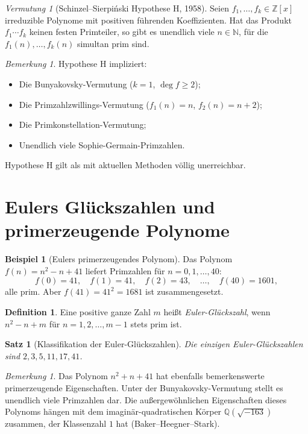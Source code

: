\documentclass[12pt,a4paper]{amsart}
\newtheorem{satz}[theorem]{Satz}
\theoremstyle{definition}
\newtheorem{definition_de}[theorem]{Definition}
\newtheorem{example}[theorem]{Beispiel}
\theoremstyle{remark}
\newtheorem{bemerkung}[theorem]{Bemerkung}
\newtheorem{vermutung}[theorem]{Vermutung}
\newcommand{\N}{\mathbb{N}}
\newcommand{\Z}{\mathbb{Z}}
\newcommand{\Q}{\mathbb{Q}}
\begin{document}
\begin{vermutung}[Schinzel--Sierpiński Hypothese H, 1958]
\label{verm:H}
Seien $f_1, \ldots, f_k \in \Z[x]$ irreduzible Polynome mit positiven
führenden Koeffizienten. Hat das Produkt $f_1 \cdots f_k$ keinen festen
Primteiler, so gibt es unendlich viele $n \in \N$, für die
$f_1(n), \ldots, f_k(n)$ simultan prim sind.
\end{vermutung}

\begin{bemerkung}
Hypothese H impliziert:
\begin{itemize}[nosep]
  \item Die Bunyakovsky-Vermutung ($k=1$, $\deg f \geq 2$);
  \item Die Primzahlzwillings-Vermutung ($f_1(n) = n$, $f_2(n) = n+2$);
  \item Die Primkonstellation-Vermutung;
  \item Unendlich viele Sophie-Germain-Primzahlen.
\end{itemize}
Hypothese H gilt als mit aktuellen Methoden völlig unerreichbar.
\end{bemerkung}

\section{Eulers Glückszahlen und primerzeugende Polynome}

\begin{example}[Eulers primerzeugendes Polynom]
Das Polynom $f(n) = n^2 - n + 41$ liefert Primzahlen für $n = 0, 1, \ldots, 40$:
\[
  f(0) = 41,\quad f(1) = 41,\quad f(2) = 43,\quad \ldots,\quad f(40) = 1601,
\]
alle prim. Aber $f(41) = 41^2 = 1681$ ist zusammengesetzt.
\end{example}

\begin{definition_de}
Eine positive ganze Zahl $m$ heißt \emph{Euler-Glückszahl}, wenn
$n^2 - n + m$ für $n = 1, 2, \ldots, m-1$ stets prim ist.
\end{definition_de}

\begin{satz}[Klassifikation der Euler-Glückszahlen]
Die einzigen Euler-Glückszahlen sind $2, 3, 5, 11, 17, 41$.
\end{satz}

\begin{bemerkung}
Das Polynom $n^2 + n + 41$ hat ebenfalls bemerkenswerte primerzeugende
Eigenschaften.
Unter der Bunyakovsky-Vermutung stellt es unendlich viele Primzahlen dar.
Die außergewöhnlichen Eigenschaften dieses Polynoms hängen mit dem
imaginär-quadratischen Körper $\Q(\sqrt{-163})$ zusammen, der
Klassenzahl $1$ hat (Baker--Heegner--Stark).
\end{bemerkung}
\end{document}
